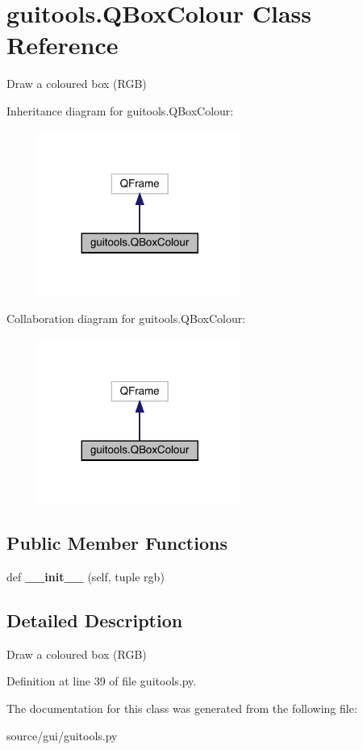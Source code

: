 \hypertarget{classguitools_1_1_q_box_colour}{}\section{guitools.\+Q\+Box\+Colour Class Reference}
\label{classguitools_1_1_q_box_colour}


Draw a coloured box (R\+GB)  




Inheritance diagram for guitools.\+Q\+Box\+Colour\+:\nopagebreak
\begin{figure}[H]
\begin{center}
\leavevmode
\includegraphics[width=188pt]{classguitools_1_1_q_box_colour__inherit__graph}
\end{center}
\end{figure}


Collaboration diagram for guitools.\+Q\+Box\+Colour\+:\nopagebreak
\begin{figure}[H]
\begin{center}
\leavevmode
\includegraphics[width=188pt]{classguitools_1_1_q_box_colour__coll__graph}
\end{center}
\end{figure}
\subsection*{Public Member Functions}
\begin{DoxyCompactItemize}
\item 
\mbox{\label{classguitools_1_1_q_box_colour_a1c145c1b22eec6303f1081dbfe772609}} 
def {\bfseries \+\_\+\+\_\+init\+\_\+\+\_\+} (self, tuple rgb)
\end{DoxyCompactItemize}


\subsection{Detailed Description}
Draw a coloured box (R\+GB) 

Definition at line 39 of file guitools.\+py.



The documentation for this class was generated from the following file\+:\begin{DoxyCompactItemize}
\item 
source/gui/guitools.\+py\end{DoxyCompactItemize}
